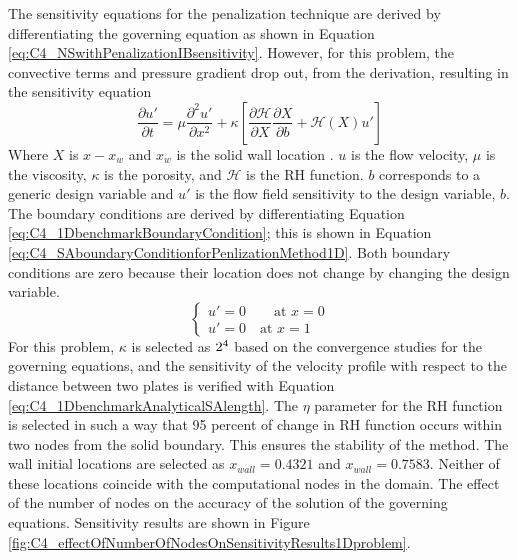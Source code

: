 The sensitivity equations for the penalization technique are derived by differentiating the governing equation as shown in Equation \eqref{eq:C4_NSwithPenalizationIBsensitivity}. However, for this problem, the convective terms and pressure gradient drop out, from the derivation, resulting in the sensitivity equation
%
\begin{equation}\label{eq:C4_SAforPenlizationMethod1D}
    \frac{\partial u'}{\partial t} = 
    \mu \frac{\partial^2 u'}{\partial x^2} +
    \kappa \left[
    \frac{\partial \mathcal{H}}{\partial X} \frac{\partial X}{\partial b} + 
    \mathcal{H}(X) u'
    \right]
\end{equation}
%
Where $X$ is $x - x_w$ and $x_w$ is the solid wall location . $u$ is the flow velocity, $\mu$ is the viscosity, $\kappa$ is the porosity, and $\mathcal{H}$ is the RH function. $b$ corresponds to a generic design variable and $u'$ is the flow field sensitivity to the design variable, $b$. The boundary conditions are derived by differentiating Equation \eqref{eq:C4_1DbenchmarkBoundaryCondition}; this is shown in Equation \eqref{eq:C4_SAboundaryConditionforPenlizationMethod1D}. Both boundary conditions are zero because their location does not change by changing the design variable.
%
\begin{equation}\label{eq:C4_SAboundaryConditionforPenlizationMethod1D}
\begin{cases}
    u' = 0 \qquad \text{at } x = 0 \\
    u' = 0 \quad \text{at } x = 1
\end{cases}
\end{equation}
%
For this problem, $\kappa$ is selected as $2 \time 10^4$ based on the convergence studies for the governing equations, and the sensitivity of the velocity profile with respect to the distance between two plates is verified with Equation \eqref{eq:C4_1DbenchmarkAnalyticalSAlength}. The $\eta$ parameter for the RH function is selected in such a way that 95 percent of change in RH function occurs within two nodes from the solid boundary. This ensures the stability of the method. The wall initial locations are selected as $x_{wall} = 0.4321$ and $x_{wall} = 0.7583$. Neither of these locations coincide with the computational nodes in the domain. The effect of the number of nodes on the accuracy of the solution of the governing equations. Sensitivity results are shown in Figure \ref{fig:C4_effectOfNumberOfNodesOnSensitivityResults1Dproblem}.
%
